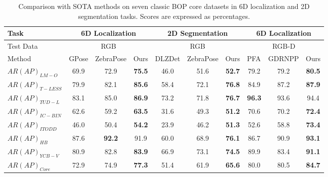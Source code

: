 \begin{table}[t]
\centering
\footnotesize
\caption{Comparison with SOTA methods on seven classic BOP core datasets in 6D localization and 2D segmentation tasks. Scores are expressed as percentages.}
\begin{tabular}{@{}l|ccc|ccc|ccc@{}}
\toprule
Task  & \multicolumn{3}{c|}{6D Localization} & \multicolumn{3}{c|}{2D Segmentation} & \multicolumn{3}{c}{6D Localization} \\
\midrule
Test Data & \multicolumn{3}{c|}{RGB} & \multicolumn{3}{c|}{RGB} & \multicolumn{3}{c}{RGB-D} \\
\midrule
Method & \multicolumn{1}{l}{GPose \cite{gpose}} & \multicolumn{1}{l}{ZebraPose \cite{bib10}} & \multicolumn{1}{l|}{Ours} & \multicolumn{1}{l}{DLZDet \cite{DLZDet}} & \multicolumn{1}{l}{ZebraPose \cite{bib10}} & \multicolumn{1}{l|}{Ours} & \multicolumn{1}{l}{PFA \cite{PFA}} & \multicolumn{1}{l}{GDRNPP \cite{gdrnpp}} & \multicolumn{1}{l}{Ours} \\
\midrule
${AR(AP)_{LM-O}}$ & 69.9  & 72.9  & \textbf{75.5}  & 46.0    & 51.6  & \textbf{52.7}  & 79.2  & 79.2  & \textbf{80.5} \\
${AR(AP)_{T-LESS}}$ & 79.9  & 82.1  & \textbf{85.6}  & 58.4  & 72.1  & \textbf{76.8}  & 84.9  & 87.2  & \textbf{87.9} \\
${AR(AP)_{TUD-L}}$ & 83.1  & 85.0    & \textbf{86.9}  & 73.2  & 71.8  & \textbf{76.7}  & \textbf{96.3}  & 93.6  & 94.4 \\
${AR(AP)_{IC-BIN}}$ & 62.6  & 59.2  & \textbf{63.5}  & 31.6  & 49.3  & \textbf{51.2}  & 70.6  & 70.2  & \textbf{72.4} \\
${AR(AP)_{ITODD}}$ & 46.0    & 50.4  & \textbf{54.2}  & 23.9  & 46.2  & \textbf{51.3}  & 52.6  & 58.8  & \textbf{73.4} \\
${AR(AP)_{HB}}$ & 87.6  & \textbf{92.2}  & 91.9  & 60.0    & 68.9  & \textbf{76.1}  & 86.7  & 90.9  & \textbf{93.1} \\
${AR(AP)_{YCB-V}}$ & 80.9  & 82.8  & \textbf{83.9}  & 66.9  & 73.1  & \textbf{74.5}  & 89.9  & 83.4  & \textbf{91.1} \\
\midrule
${AR(AP)_{Core}}$ & 72.9  & 74.9  & \textbf{77.3}  & 51.4  & 61.9  & \textbf{65.6}  & 80.0    & 80.5  & \textbf{84.7} \\
\bottomrule
\end{tabular}
\label{tab3}
\end{table}

